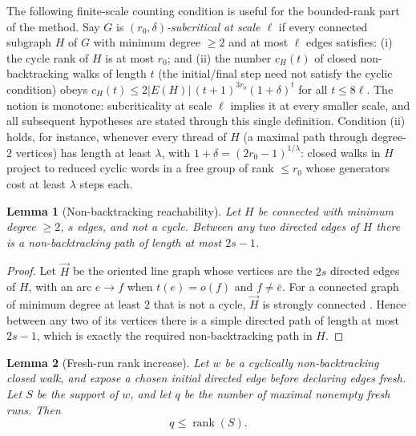 \documentclass[11pt]{article}
\newtheorem{lemma}{Lemma}
\theoremstyle{remark}
\begin{document}
The following finite-scale counting condition is useful for the
bounded-rank part of the method. Say $G$ is \emph{$(r_0,\delta)$-subcritical
at scale $\ell$} if every connected subgraph $H$ of $G$ with minimum degree
$\ge2$ and at most $\ell$ edges satisfies: (i) the cycle rank of $H$
is at most $r_0$; and (ii) the number $c_H(t)$ of closed non-backtracking walks of length $t$
(the initial/final step need not satisfy the cyclic condition) obeys
$c_H(t)\le 2|E(H)|\,(t+1)^{3r_0}(1+\delta)^{t}$ for all $t\le8\ell$.
The notion is monotone: subcriticality at scale $\ell$ implies it
at every smaller scale, and all subsequent hypotheses are stated
through this single definition.
Condition (ii) holds, for instance, whenever every thread of $H$ (a
maximal path through degree-$2$ vertices) has length at least
$\lambda$, with $1+\delta=(2r_0-1)^{1/\lambda}$: closed walks in $H$
project to reduced cyclic words in a free group of rank $\le r_0$ whose
generators cost at least $\lambda$ steps each.

\begin{lemma}[Non-backtracking reachability]\label{lem:reach}
Let $H$ be connected with minimum degree $\ge2$, $s$ edges, and not a
cycle. Between any two directed edges of $H$ there is a
non-backtracking path of length at most $2s-1$.
\end{lemma}

\begin{proof}
Let $\overrightarrow H$ be the oriented line graph whose vertices are the
$2s$ directed edges of $H$, with an arc $e\to f$ when $t(e)=o(f)$ and
$f\ne\bar e$. For a connected graph of minimum degree at least $2$ that
is not a cycle, $\overrightarrow H$ is strongly connected \cite[Section~1]{ks00}.
Hence between any two of its vertices there is a simple directed path of
length at most $2s-1$, which is exactly the required non-backtracking path in $H$.
\end{proof}

\begin{lemma}[Fresh-run rank increase]\label{lem:fresh}
Let $w$ be a cyclically non-backtracking closed walk, and expose a chosen
initial directed edge before declaring edges fresh. Let $S$ be the support
of $w$, and let $q$ be the number of maximal nonempty fresh runs. Then
\[
q\le \operatorname{rank}(S).
\]
\end{lemma}
\end{document}
